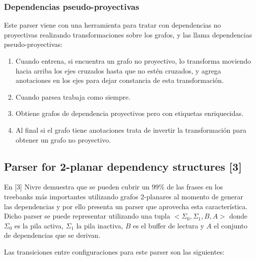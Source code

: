 \documentclass[11pt,a4paper,spanish]{article}
\begin{document}
\subsubsection{Dependencias pseudo-proyectivas}

Este parser viene con una herramienta para tratar con dependencias no proyectivas realizando transformaciones sobre los grafos, y las llama dependencias pseudo-proyectivas:

\begin{enumerate}
\item Cuando entrena, si encuentra un grafo no proyectivo, lo transforma moviendo hacia arriba los ejes cruzados hasta que no estén cruzados, y agrega anotaciones en los ejes para dejar constancia de esta transformación.
\item Cuando parsea trabaja como siempre.
\item Obtiene grafos de dependencia proyectivos pero con etiquetas enriquecidas.
\item Al final si el grafo tiene anotaciones trata de invertir la transformación para obtener un grafo no proyectivo.
\end{enumerate}

\subsection{Parser for 2-planar dependency structures [3]} 

En [3] Nivre demuestra que se pueden cubrir un 99\% de las frases en los treebanks más importantes utilizando grafos 2-planares al momento de generar las dependencias y por ello presenta un parser que aprovecha esta característica. Dicho parser se puede representar utilizando una tupla 
$<\Sigma_0,\Sigma_1,B,A>$ donde $\Sigma_0$ es la pila activa, $\Sigma_1$ la pila inactiva, $B$ es el buffer de lectura y $A$ el conjunto de dependencias que se derivan. 

Las transiciones entre configuraciones para este parser son las siguientes:
\end{document}
